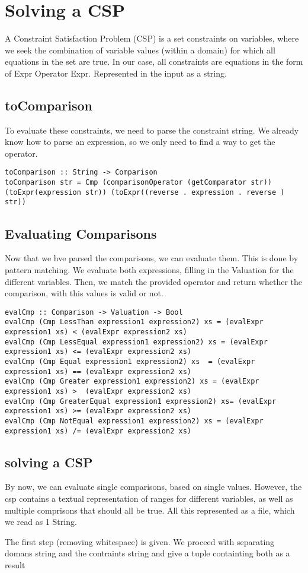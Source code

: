 \documentclass[a4paper,11pt]{article}
\begin{document}
\section{Solving a CSP}

A Constraint Satisfaction Problem (CSP) is a set constraints on variables,  where we seek the combination of variable values (within a domain) for which all equations in the set are true. In our case, all constraints are equations in the form of Expr Operator Expr. Represented in the input as a string. 

\subsection{toComparison}

To evaluate these constraints, we need to parse the constraint string. We already know how to parse an expression, so we only need to find a way to get the operator.
\begin{lstlisting}
toComparison :: String -> Comparison
toComparison str = Cmp (comparisonOperator (getComparator str)) (toExpr(expression str)) (toExpr((reverse . expression . reverse ) str))
\end{lstlisting}

\subsection{Evaluating Comparisons}

Now that we hve parsed the comparisons, we can evaluate them. This is done by pattern matching. We evaluate both expressions, filling in the Valuation for the different variables. Then, we match the provided operator and return whether the comparison, with this values is valid or not.
\begin{lstlisting}
evalCmp :: Comparison -> Valuation -> Bool
evalCmp (Cmp LessThan expression1 expression2) xs = (evalExpr expression1 xs) < (evalExpr expression2 xs)
evalCmp (Cmp LessEqual expression1 expression2) xs = (evalExpr expression1 xs) <= (evalExpr expression2 xs)
evalCmp (Cmp Equal expression1 expression2) xs 	= (evalExpr expression1 xs) == (evalExpr expression2 xs)
evalCmp (Cmp Greater expression1 expression2) xs = (evalExpr expression1 xs) > 	(evalExpr expression2 xs)
evalCmp (Cmp GreaterEqual expression1 expression2) xs= (evalExpr expression1 xs) >= (evalExpr expression2 xs)
evalCmp (Cmp NotEqual expression1 expression2) xs = (evalExpr expression1 xs) /= (evalExpr expression2 xs)
\end{lstlisting}
\subsection{solving a CSP}

By now, we can evaluate single comparisons, based on single values. However, the csp contains a textual representation of ranges for different variables, as well as multiple comprisons that should all be true. All this represented as a file, which we read as 1 String.

The first step (removing whitespace) is given. We proceed with separating domans string and the contraints string and give a tuple containting both as a result
\end{document}
